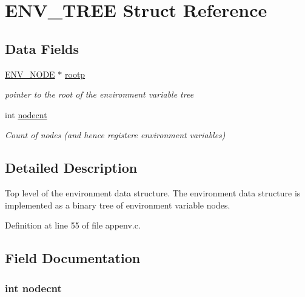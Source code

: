 \hypertarget{struct_e_n_v___t_r_e_e}{\section{E\-N\-V\-\_\-\-T\-R\-E\-E Struct Reference}
\label{struct_e_n_v___t_r_e_e}
}
\subsection*{Data Fields}
\begin{DoxyCompactItemize}
\item 
\hyperlink{struct_e_n_v___n_o_d_e}{E\-N\-V\-\_\-\-N\-O\-D\-E} $\ast$ \hyperlink{struct_e_n_v___t_r_e_e_a8311200b56298533a3c4a61081207326}{rootp}
\begin{DoxyCompactList}\small\item\em pointer to the root of the environment variable tree \end{DoxyCompactList}\item 
int \hyperlink{struct_e_n_v___t_r_e_e_a1651c6cf3ef1d5ab896f2306460111c5}{nodecnt}
\begin{DoxyCompactList}\small\item\em Count of nodes (and hence registere environment variables) \end{DoxyCompactList}\end{DoxyCompactItemize}


\subsection{Detailed Description}
Top level of the environment data structure. The environment data structure is implemented as a binary tree of environment variable nodes. 

Definition at line 55 of file appenv.\-c.



\subsection{Field Documentation}
\hypertarget{struct_e_n_v___t_r_e_e_a1651c6cf3ef1d5ab896f2306460111c5}{
\subsubsection[{nodecnt}]{\setlength{\rightskip}{0pt plus 5cm}int nodecnt}}\label{struct_e_n_v___t_r_e_e_a1651c6cf3ef1d5ab896f2306460111c5}


